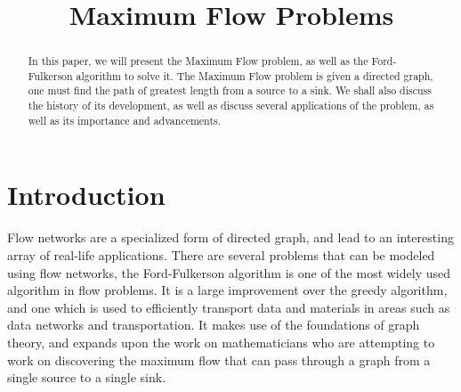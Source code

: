 \documentclass[conference]{IEEEtran}
\begin{document}
%
\title{Maximum Flow Problems}


\author{
}

\maketitle

\begin{abstract}
In this paper, we will present the Maximum Flow problem, as well as the Ford-Fulkerson algorithm to solve it. The Maximum Flow problem is given a directed graph, one must find the path of greatest length from a source to a sink. We shall also discuss the history of its development, as well as discuss several applications of the problem, as well as its importance and advancements.
\end{abstract}





%
\IEEEpeerreviewmaketitle



\section{Introduction}
Flow networks are a specialized form of directed graph, and lead to an interesting array of real-life applications. There are several problems that can be modeled using flow networks, the Ford-Fulkerson algorithm is one of the most widely used algorithm in flow problems. It is a large improvement over the greedy algorithm, and one which is used to efficiently transport data and materials in areas such as data networks and transportation. It makes use of the foundations of graph theory, and expands upon the work on mathematicians who are attempting to work on discovering the maximum flow that can pass through a graph from a single source to a single sink.
\end{document}
